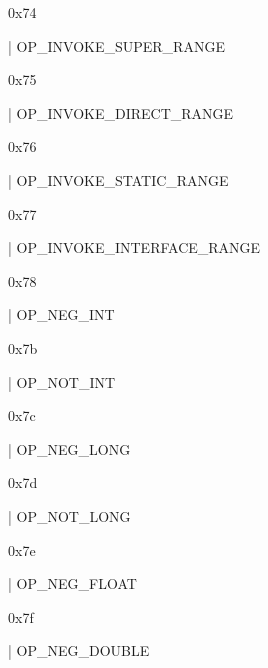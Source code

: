 \documentclass[11pt]{article}
\begin{document}
\begin{ocamldoccomment}
0x74
\end{ocamldoccomment}
\begin{ocamldoccode}
  | OP_INVOKE_SUPER_RANGE
\end{ocamldoccode}
\begin{ocamldoccomment}
0x75
\end{ocamldoccomment}
\begin{ocamldoccode}
  | OP_INVOKE_DIRECT_RANGE
\end{ocamldoccode}
\begin{ocamldoccomment}
0x76
\end{ocamldoccomment}
\begin{ocamldoccode}
  | OP_INVOKE_STATIC_RANGE
\end{ocamldoccode}
\begin{ocamldoccomment}
0x77
\end{ocamldoccomment}
\begin{ocamldoccode}
  | OP_INVOKE_INTERFACE_RANGE
\end{ocamldoccode}
\begin{ocamldoccomment}
0x78
\end{ocamldoccomment}
\begin{ocamldoccode}
  | OP_NEG_INT
\end{ocamldoccode}
\begin{ocamldoccomment}
0x7b
\end{ocamldoccomment}
\begin{ocamldoccode}
  | OP_NOT_INT
\end{ocamldoccode}
\begin{ocamldoccomment}
0x7c
\end{ocamldoccomment}
\begin{ocamldoccode}
  | OP_NEG_LONG
\end{ocamldoccode}
\begin{ocamldoccomment}
0x7d
\end{ocamldoccomment}
\begin{ocamldoccode}
  | OP_NOT_LONG
\end{ocamldoccode}
\begin{ocamldoccomment}
0x7e
\end{ocamldoccomment}
\begin{ocamldoccode}
  | OP_NEG_FLOAT
\end{ocamldoccode}
\begin{ocamldoccomment}
0x7f
\end{ocamldoccomment}
\begin{ocamldoccode}
  | OP_NEG_DOUBLE
\end{ocamldoccode}
\end{document}
